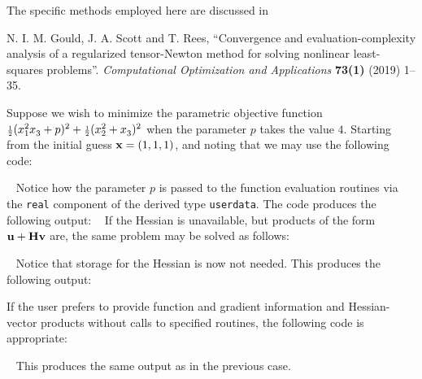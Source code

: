\documentclass{galahad}
\begin{document}
\noindent
The specific methods employed here are discussed in
\vspace*{1mm}

\noindent
N. I. M. Gould, J. A. Scott and T. Rees,
``Convergence and evaluation-complexity analysis of a regularized
tensor-Newton method for solving nonlinear least-squares problems''.
{\em Computational Optimization and Applications}
{\bf 73(1)} (2019) 1--35.


\galexamples
Suppose we wish to minimize the parametric objective function
${\scriptstyle \frac{1}{2}}  ( x_1^2 x_3^{} + p )^2 + {\scriptstyle \frac{1}{2}} (x_2^2 + x_3^{} )^2$
when the parameter $p$ takes the value $4$. Starting from the
initial guess ${\mathbf{x}} = (1,1,1)$, and noting that
we may use the following code:

{\tt \small
\VerbatimInput{\packageexample}
}
\noindent
Notice how the parameter $p$ is passed to the function evaluation
routines via the {\tt real} component of the derived type {\tt userdata}.
The code produces the following output:
{\tt \small
\VerbatimInput{\packageresults}
}
\noindent
If the Hessian is unavailable, but products of the form
${\mathbf{u}} + {\mathbf{H}} {\mathbf{v}}$ are, the same problem may be solved as follows:

{\tt \small
\VerbatimInput{\packageexampleb}
}
\noindent
Notice that storage for the Hessian is now not needed.
This produces the %
following output:
{\tt \small
\VerbatimInput{\packageresultsb}
}
\noindent

If the user prefers to provide function and gradient information and
Hessian-vector products
without calls to specified routines, the following code is appropriate:

{\tt \small
\VerbatimInput{\packageexamplec}
}
\noindent
This produces the same output as in the previous case.
\noindent
\end{document}
